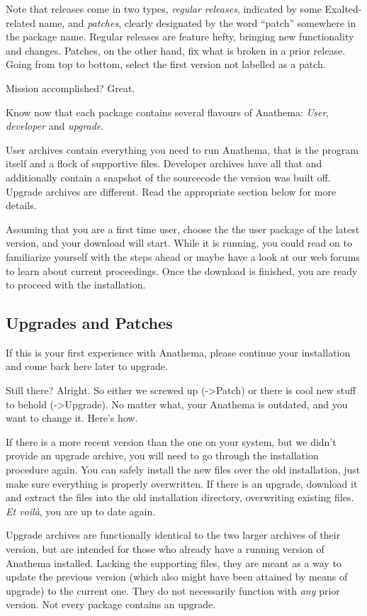 Note that releases come in two types, \emph{regular releases}, indicated by some Exalted-related name, and \emph{patches}, clearly designated by the word ``patch'' somewhere in the package name.
Regular releases are feature hefty, bringing new functionality and changes. Patches, on the other hand, fix what is broken in a prior release. 
Going from top to bottom, select the first version not labelled as a patch.

Mission accomplished? Great.

Know now that each package contains several flavours of Anathema:  \emph{User}, \emph{developer} and \emph{upgrade}.

User archives contain everything you need to run Anathema, that is the program itself and a flock of supportive files. Developer archives have all that and additionally contain a snapshot of the sourcecode the version was built off.
Upgrade archives are different. Read the appropriate section below for more details.

Assuming that you are a first time user, choose the the user package of the latest version, and your download will start. While it is running, you could read on to familiarize yourself with the steps ahead or maybe have a look at our web forums to learn about current proceedings.
\medskip
\newline
Once the download is finished, you are ready to proceed with the installation.

\subsection{Upgrades and Patches}
If this is your first experience with Anathema, please continue your installation and come back here later to upgrade.

Still there? Alright. So either we screwed up (->Patch) or there is cool new stuff to behold (->Upgrade). No matter what, your Anathema is outdated, and you want to change it. Here's how.

If there is a more recent version than the one on your system, but we didn't provide an upgrade archive, you will need to go through the installation procedure again. You can safely install the new files over the old installation, just make sure everything is properly overwritten.
If there is an upgrade, download it and extract the files into the old installation directory, overwriting existing files. \textit{Et voil\`a}, you are up to date again.

Upgrade archives are functionally identical to the two larger archives of their version, but are intended for those who already have a running version of Anathema installed. Lacking the supporting files, they are meant as a way to update the previous version (which also might have been attained by means of upgrade) to the current one. They do not necessarily function with \emph{any} prior version. Not every package contains an upgrade.

